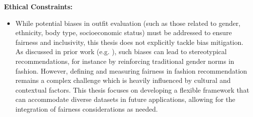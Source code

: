 \vspace{0.5cm}

\textbf{Ethical Constraints:}

\begin{itemize}
  \item While potential biases in outfit evaluation (such as those related to gender, ethnicity, body type, socioeconomic status) must be addressed to ensure fairness and inclusivity, this thesis does not explicitly tackle bias mitigation. As discussed in prior work (e.g. \cite[cf.]{deldjoo_review_2022}), such biases can lead to stereotypical recommendations, for instance by reinforcing traditional gender norms in fashion. However, defining and measuring fairness in fashion recommendation remains a complex challenge which is heavily influenced by cultural and contextual factors. This thesis focuses on developing a flexible framework that can accommodate diverse datasets in future applications, allowing for the integration of fairness considerations as needed.
\end{itemize}
